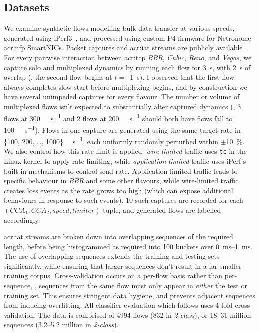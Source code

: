\subsection{Datasets}\label{sec:seidr-datasets}
We examine synthetic flows modelling bulk data transfer at various speeds, generated using iPerf3~\parencite{iperf3}, and processed using custom P4 firmware for Netronome \gls{acr:nfp} SmartNICs.
Packet captures and \gls{acr:iat} streams are publicly available~\parencite{ht-imc-data,ht-imc-poster}.
For every pairwise interaction between \gls{acr:tcp} \emph{BBR}, \emph{Cubic}, \emph{Reno}, and \emph{Vegas}, we capture solo and multiplexed dynamics by running each flow for \qty{3}{\second}, with \qty{2}{\second} of overlap (\ie, the second flow begins at $t=$~\qty{1}{\second}).
I observed that the first flow always completes slow-start before multiplexing begins, and by construction we have several unimpeded captures for every flavour.
The number or volume of multiplexed flows isn't expected to substantially alter captured dynamics (\ie, 3 flows at \qty{300}{\mega\bit\per\second} and 2 flows at \qty{200}{\mega\bit\per\second} should both have flows fall to \qty{100}{\mega\bit\per\second}).
Flows in one capture are generated using the same target rate in \{\num{100}, \num{200}, \dots, \num{1000}\} \unit{\mega\bit\per\second}, each uniformly randomly perturbed within $\pm$\qty{10}{\percent}.
We also control how this rate limit is applied: \emph{wire-limited} traffic uses \texttt{tc} in the Linux kernel to apply rate-limiting, while \emph{application-limited} traffic uses iPerf's built-in mechanisms to control send rate.
Application-limited traffic leads to specific behaviour in \emph{BBR} and some other flavours, while wire-limited traffic creates loss events as the rate grows too high (which can expose additional behaviours in response to such events).
\num{10} such captures are recorded for each $\left(\mathit{CCA}_1,\mathit{CCA}_2,\mathit{speed},\mathit{limiter}\right)$ tuple, and generated flows are labelled accordingly.

\gls{acr:iat} streams are broken down into overlapping sequences of the required length, before being histogrammed as required into \num{100} buckets over \qtyrange{0}{1}{\milli\second}.
The use of overlapping sequences extends the training and testing sets significantly, while ensuring that larger sequences don't result in a far smaller training corpus.
Cross-validation occurs on a per-flow basis rather than per-sequence, \ie, sequences from the same flow must only appear in \emph{either} the test or training set.
This ensures stringent data hygiene, and prevents adjacent sequences from inducing overfitting.
All classifier evaluation which follows uses 4-fold cross-validation.
The data is comprised of \num{4994} flows (\num{832} in \emph{2-class}), or \numrange{18}{31} million sequences (\numrange{3.2}{5.2} million in \emph{2-class}).

